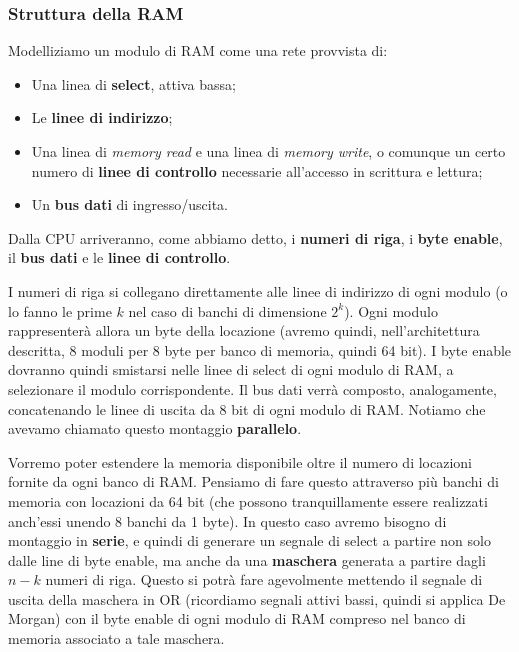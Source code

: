 \documentclass[a4paper,11pt]{article}
\begin{document}
\subsubsection{Struttura della RAM}
Modelliziamo un modulo di RAM come una rete provvista di:
\begin{itemize}
	\item Una linea di \textbf{select}, attiva bassa;
	\item Le \textbf{linee di indirizzo};
	\item Una linea di \textit{memory read} e una linea di \textit{memory write}, o comunque un certo numero di \textbf{linee di controllo} necessarie all'accesso in scrittura e lettura;
	\item Un \textbf{bus dati} di ingresso/uscita. 
\end{itemize}

Dalla CPU arriveranno, come abbiamo detto, i \textbf{numeri di riga}, i \textbf{byte enable}, il \textbf{bus dati} e le \textbf{linee di controllo}.

I numeri di riga si collegano direttamente alle linee di indirizzo di ogni modulo (o lo fanno le prime $k$ nel caso di banchi di dimensione $2^k$).
Ogni modulo rappresenterà allora un byte della locazione (avremo quindi, nell'architettura descritta, 8 moduli per 8 byte per banco di memoria, quindi 64 bit).
I byte enable dovranno quindi smistarsi nelle linee di select di ogni modulo di RAM, a selezionare il modulo corrispondente.
Il bus dati verrà composto, analogamente, concatenando le linee di uscita da 8 bit di ogni modulo di RAM. 
Notiamo che avevamo chiamato questo montaggio \textbf{parallelo}.

\par\smallskip 

Vorremo poter estendere la memoria disponibile oltre il numero di locazioni fornite da ogni banco di RAM.
Pensiamo di fare questo attraverso più banchi di memoria con locazioni da 64 bit (che possono tranquillamente essere realizzati anch'essi unendo 8 banchi da 1 byte).
In questo caso avremo bisogno di montaggio in \textbf{serie}, e quindi di generare un segnale di select a partire non solo dalle line di byte enable, ma anche da una \textbf{maschera} generata a partire dagli $n - k$ numeri di riga.
Questo si potrà fare agevolmente mettendo il segnale di uscita della maschera in OR (ricordiamo segnali attivi bassi, quindi si applica De Morgan) con il byte enable di ogni modulo di RAM compreso nel banco di memoria associato a tale maschera.
\end{document}
